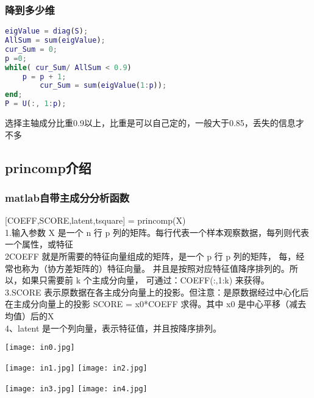 \begin{frame}[fragile]
\frametitle{降到多少维}
\begin{lstlisting}[language=Matlab]
eigValue = diag(S);
AllSum = sum(eigValue);
cur_Sum = 0;
p =0;
while( cur_Sum/ AllSum < 0.9)
	p = p + 1;
        cur_Sum = sum(eigValue(1:p));
end;
P = U(:, 1:p);
\end{lstlisting}
选择主轴成分比重0.9以上，比重是可以自己定的，一般大于0.85，丢失的信息才不多
\end{frame}


\subsection{princomp介绍}
\begin{frame}
\frametitle{matlab自带主成分分析函数}
[COEFF,SCORE,latent,tsquare] = princomp(X)\\
1.输入参数 X 是一个 n 行 p 列的矩阵。每行代表一个样本观察数据，每列则代表一个属性，或特征\\
2COEFF 就是所需要的特征向量组成的矩阵，是一个 p 行 p 列的矩阵，
每，经常也称为（协方差矩阵的）特征向量。
并且是按照对应特征值降序排列的。所以，如果只需要前 k 个主成分向量，
可通过：COEFF(:,1:k) 来获得。\\
3.SCORE 表示原数据在各主成分向量上的投影。但注意：是原数据经过中心化后在主成分向量上的投影
SCORE = x0*COEFF 求得。其中 x0 是中心平移（减去均值）后的X\\
4、latent 是一个列向量，表示特征值，并且按降序排列。
\end{frame}

\begin{frame}
\begin{center}
\texttt{[image: in0.jpg]}
\end{center}
\end{frame}


\begin{frame}
\texttt{[image: in1.jpg]}
\texttt{[image: in2.jpg]}
\end{frame}

\begin{frame}
\texttt{[image: in3.jpg]}
\texttt{[image: in4.jpg]}
\end{frame}



